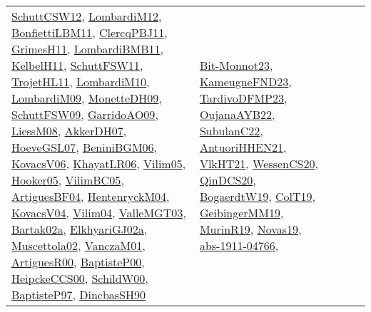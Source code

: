 {\begin{longtable}{lp{3cm}>{\raggedright}p{6cm}>{\raggedright}p{6cm}p{8cm}}
\href{papers/SchuttCSW12.pdf}{SchuttCSW12}\cite{SchuttCSW12}, \href{articles/LombardiM12.pdf}{LombardiM12}\cite{LombardiM12}, \href{papers/BonfiettiLBM11.pdf}{BonfiettiLBM11}\cite{BonfiettiLBM11}, \href{papers/ClercqPBJ11.pdf}{ClercqPBJ11}\cite{ClercqPBJ11}, \href{papers/GrimesH11.pdf}{GrimesH11}\cite{GrimesH11}, \href{papers/LombardiBMB11.pdf}{LombardiBMB11}\cite{LombardiBMB11}, \href{articles/KelbelH11.pdf}{KelbelH11}\cite{KelbelH11}, \href{articles/SchuttFSW11.pdf}{SchuttFSW11}\cite{SchuttFSW11}, \href{articles/TrojetHL11.pdf}{TrojetHL11}\cite{TrojetHL11}, \href{papers/LombardiM10.pdf}{LombardiM10}\cite{LombardiM10}, \href{papers/LombardiM09.pdf}{LombardiM09}\cite{LombardiM09}, \href{papers/MonetteDH09.pdf}{MonetteDH09}\cite{MonetteDH09}, \href{papers/SchuttFSW09.pdf}{SchuttFSW09}\cite{SchuttFSW09}, \href{articles/GarridoAO09.pdf}{GarridoAO09}\cite{GarridoAO09}, \href{articles/LiessM08.pdf}{LiessM08}\cite{LiessM08}, \href{papers/AkkerDH07.pdf}{AkkerDH07}\cite{AkkerDH07}, \href{papers/HoeveGSL07.pdf}{HoeveGSL07}\cite{HoeveGSL07}, \href{papers/BeniniBGM06.pdf}{BeniniBGM06}\cite{BeniniBGM06}, \href{papers/KovacsV06.pdf}{KovacsV06}\cite{KovacsV06}, \href{articles/KhayatLR06.pdf}{KhayatLR06}\cite{KhayatLR06}, \href{papers/Vilim05.pdf}{Vilim05}\cite{Vilim05}, \href{articles/Hooker05.pdf}{Hooker05}\cite{Hooker05}, \href{articles/VilimBC05.pdf}{VilimBC05}\cite{VilimBC05}, \href{papers/ArtiguesBF04.pdf}{ArtiguesBF04}\cite{ArtiguesBF04}, \href{papers/HentenryckM04.pdf}{HentenryckM04}\cite{HentenryckM04}, \href{papers/KovacsV04.pdf}{KovacsV04}\cite{KovacsV04}, \href{papers/Vilim04.pdf}{Vilim04}\cite{Vilim04}, \href{papers/ValleMGT03.pdf}{ValleMGT03}\cite{ValleMGT03}, \href{papers/Bartak02a.pdf}{Bartak02a}\cite{Bartak02a}, \href{papers/ElkhyariGJ02a.pdf}{ElkhyariGJ02a}\cite{ElkhyariGJ02a}, \href{papers/Muscettola02.pdf}{Muscettola02}\cite{Muscettola02}, \href{papers/VanczaM01.pdf}{VanczaM01}\cite{VanczaM01}, \href{articles/ArtiguesR00.pdf}{ArtiguesR00}\cite{ArtiguesR00}, \href{articles/BaptisteP00.pdf}{BaptisteP00}\cite{BaptisteP00}, \href{articles/HeipckeCCS00.pdf}{HeipckeCCS00}\cite{HeipckeCCS00}, \href{articles/SchildW00.pdf}{SchildW00}\cite{SchildW00}, \href{papers/BaptisteP97.pdf}{BaptisteP97}\cite{BaptisteP97}, \href{articles/DincbasSH90.pdf}{DincbasSH90}\cite{DincbasSH90} & \href{papers/Bit-Monnot23.pdf}{Bit-Monnot23}\cite{Bit-Monnot23}, \href{papers/KameugneFND23.pdf}{KameugneFND23}\cite{KameugneFND23}, \href{papers/TardivoDFMP23.pdf}{TardivoDFMP23}\cite{TardivoDFMP23}, \href{papers/OujanaAYB22.pdf}{OujanaAYB22}\cite{OujanaAYB22}, \href{articles/SubulanC22.pdf}{SubulanC22}\cite{SubulanC22}, \href{papers/AntuoriHHEN21.pdf}{AntuoriHHEN21}\cite{AntuoriHHEN21}, \href{articles/VlkHT21.pdf}{VlkHT21}\cite{VlkHT21}, \href{papers/WessenCS20.pdf}{WessenCS20}\cite{WessenCS20}, \href{articles/QinDCS20.pdf}{QinDCS20}\cite{QinDCS20}, \href{papers/BogaerdtW19.pdf}{BogaerdtW19}\cite{BogaerdtW19}, \href{papers/ColT19.pdf}{ColT19}\cite{ColT19}, \href{papers/GeibingerMM19.pdf}{GeibingerMM19}\cite{GeibingerMM19}, \href{papers/MurinR19.pdf}{MurinR19}\cite{MurinR19}, \href{articles/Novas19.pdf}{Novas19}\cite{Novas19}, \href{articles/abs-1911-04766.pdf}{abs-1911-04766}\cite{abs-1911-04766}, 
\end{longtable}}
